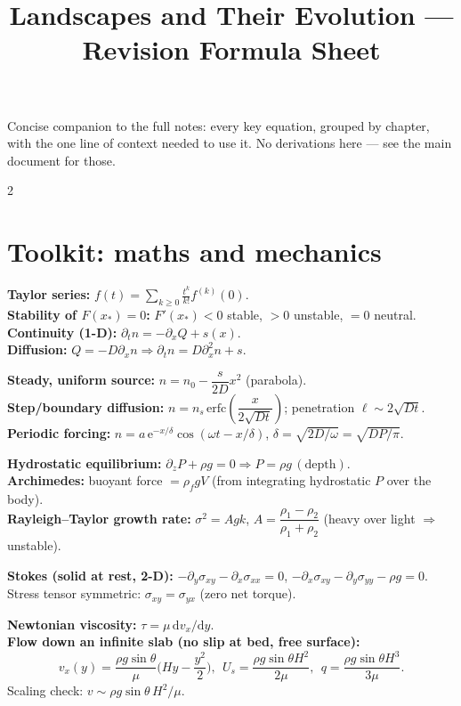 \documentclass[9pt,a4paper]{extarticle}
\title{\vspace{-1.3cm}\textbf{\large Landscapes and Their Evolution --- Revision Formula Sheet}\vspace{-4pt}}
\author{}
\date{}
\newcommand{\dd}{\mathrm{d}}
\newcommand{\ee}{\mathrm{e}}
\begin{document}
\maketitle
\vspace{-16pt}
{\footnotesize Concise companion to the full notes: every key equation, grouped by chapter, with the one line of context needed to use it. No derivations here --- see the main document for those.\par}
\begin{multicols}{2}

\section{Toolkit: maths and mechanics}
\begin{eqbox}
\textbf{Taylor series:} $f(t)=\sum_{k\ge0}\frac{t^k}{k!}f^{(k)}(0)$.\\
\textbf{Stability of $F(x_*)=0$:} $F'(x_*)<0$ stable, $>0$ unstable, $=0$ neutral.\\
\textbf{Continuity (1-D):} $\partial_tn=-\partial_xQ+s(x)$.\\
\textbf{Diffusion:} $Q=-D\partial_xn\Rightarrow\partial_tn=D\partial_x^2n+s$.
\end{eqbox}
\begin{eqbox}
\textbf{Steady, uniform source:} $n=n_0-\dfrac{s}{2D}x^2$ (parabola).\\
\textbf{Step/boundary diffusion:} $n=n_s\,\mathrm{erfc}\!\left(\dfrac{x}{2\sqrt{Dt}}\right)$; penetration $\ell\sim2\sqrt{Dt}$.\\
\textbf{Periodic forcing:} $n=a\,\ee^{-x/\delta}\cos(\omega t-x/\delta)$, $\delta=\sqrt{2D/\omega}=\sqrt{DP/\pi}$.
\end{eqbox}
\begin{eqbox}
\textbf{Hydrostatic equilibrium:} $\partial_zP+\rho g=0\Rightarrow P=\rho g\,(\text{depth})$.\\
\textbf{Archimedes:} buoyant force $=\rho_fgV$ (from integrating hydrostatic $P$ over the body).\\
\textbf{Rayleigh--Taylor growth rate:} $\sigma^2=Agk$, $A=\dfrac{\rho_1-\rho_2}{\rho_1+\rho_2}$ (heavy over light $\Rightarrow$ unstable).
\end{eqbox}
\begin{eqbox}
\textbf{Stokes (solid at rest, 2-D):}
$-\partial_y\sigma_{xy}-\partial_x\sigma_{xx}=0$,\quad
$-\partial_x\sigma_{xy}-\partial_y\sigma_{yy}-\rho g=0$.\\
Stress tensor symmetric: $\sigma_{xy}=\sigma_{yx}$ (zero net torque).
\end{eqbox}
\begin{eqbox}
\textbf{Newtonian viscosity:} $\tau=\mu\,\dd v_x/\dd y$.\\
\textbf{Flow down an infinite slab (no slip at bed, free surface):}
\[
v_x(y)=\frac{\rho g\sin\theta}{\mu}\Big(Hy-\frac{y^2}2\Big),\ \ U_s=\frac{\rho g\sin\theta H^2}{2\mu},\ \ q=\frac{\rho g\sin\theta H^3}{3\mu}.
\]
Scaling check: $v\sim\rho g\sin\theta\,H^2/\mu$.
\end{eqbox}


\end{multicols}
\end{document}

